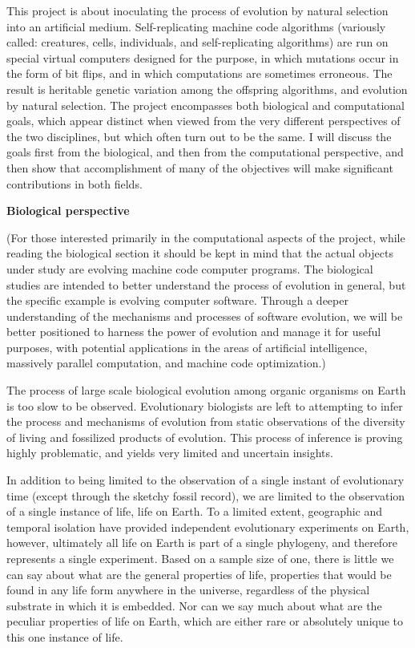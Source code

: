 This project is about inoculating the process of evolution by natural
selection into an artificial medium.  Self-replicating machine code algorithms
(variously called: creatures, cells, individuals, and self-replicating
algorithms) are run on special virtual computers designed for the purpose, in
which mutations occur in the form of bit flips, and in which computations are
sometimes erroneous.  The result is heritable genetic variation among the
offspring algorithms, and evolution by natural selection.  The project
encompasses both biological and computational goals, which appear distinct
when viewed from the very different perspectives of the two disciplines,
but which often turn out to be the same.  I will discuss the goals first
from the biological, and then from the computational perspective, and then
show that accomplishment of many of the objectives will make significant
contributions in both fields.

\LP
{\bf Biological perspective}
\eLP

(For those interested primarily in the computational aspects of the project,
while reading the biological section it should be kept in mind that the actual
objects under study are evolving machine code computer programs.  The
biological studies are intended to better understand the process of evolution
in general, but the specific example is evolving computer software.  Through a
deeper understanding of the mechanisms and processes of software evolution, we
will be better positioned to harness the power of evolution and manage it for
useful purposes, with potential applications in the areas of artificial
intelligence, massively parallel computation, and machine code optimization.)

The process of large scale biological evolution among organic organisms on
Earth is too slow to be observed.  Evolutionary biologists are left to
attempting to infer the process and mechanisms of evolution from static
observations of the diversity of living and fossilized products of evolution.
This process of inference is proving highly problematic, and yields very
limited and uncertain insights.

In addition to being limited to the observation of a single instant of
evolutionary time (except through the sketchy fossil record), we are limited
to the observation of a single instance of life, life on Earth.  To a
limited extent, geographic and temporal isolation have provided independent
evolutionary experiments on Earth, however, ultimately all life on Earth
is part of a single phylogeny, and therefore represents a single experiment.
Based on a sample size of one, there is little we can say about what are the
general properties of life, properties that would be found in any life
form anywhere in the universe, regardless of the physical substrate in which
it is embedded.  Nor can we say much about what are the peculiar properties
of life on Earth, which are either rare or absolutely unique to this one
instance of life.

